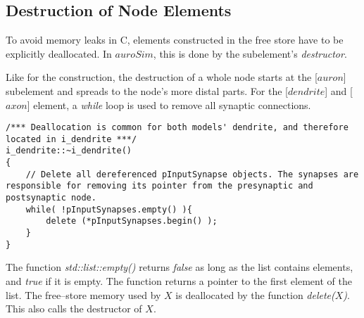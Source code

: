 			
		\subsection*{Destruction of Node Elements}
			To avoid memory leaks in C, elements constructed in the free store have to be explicitly deallocated.
			In $auroSim$, this is done by the subelement's \emph{destructor}.
 
			Like for the construction, the destruction of a whole node starts at the [$auron$] subelement and spreads to the node's more distal parts.
 			For the [$dendrite$] and [$axon$] element, a \emph{while} loop is used to remove all synaptic connections.
\begin{lstlisting}
/*** Deallocation is common for both models' dendrite, and therefore located in i_dendrite ***/
i_dendrite::~i_dendrite()
{
	// Delete all dereferenced pInputSynapse objects. The synapses are responsible for removing its pointer from the presynaptic and postsynaptic node.
	while( !pInputSynapses.empty() ){
	 	delete (*pInputSynapses.begin() );
	}
}
\end{lstlisting}
			The function \emph{std::list::empty()} returns \emph{false} as long as the list contains elements, and \emph{true} if it is empty.
			The function  returns a pointer to the first element of the list.
			The free--store memory used by $X$ is deallocated by the function \emph{delete($X$)}. 
			This also calls the destructor of $X$. %

